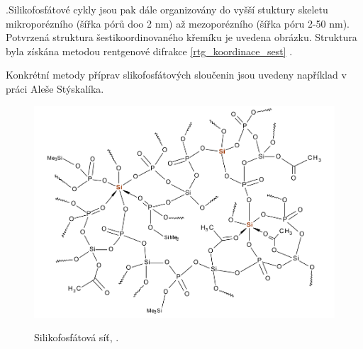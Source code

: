 \documentclass[
  digital, %
  table,   %
  lof,     %
  lot,     %
  oneside,
]{fithesis3}
\begin{document}
  \begin{center}
    \end{center}
   \cite{Styskalik2015thesis}.Silikofosfátové cykly jsou pak dále organizovány do vyšší stuktury skeletu mikroporézního (šířka pórů doo 2 nm) až mezoporézního (šířka póru 2-50 nm). Potvrzená struktura šestikoordinovaného křemíku je uvedena obrázku. Struktura byla získána metodou rentgenové difrakce \ref{rtg_koordinace_sest} \cite{C3NJ00721A}.

    Konkrétní metody příprav slikofosfátových sloučenin jsou uvedeny například v práci Aleše Stýskalíka. \\

\begin{figure}[h!]
\caption{Silikofosfátová síť, \cite{Styskalik2015thesis}. }
  \includegraphics[width=12cm]{si_polymer_cely.png}
  \label{si_polymer_cely}
  \end{figure}
\end{document}
